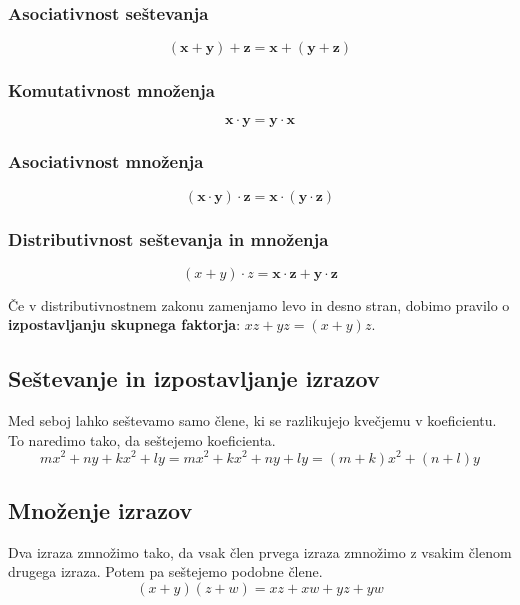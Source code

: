     
                    \subsubsection*{Asociativnost seštevanja}
                    $$ \mathbf{(x+ y)+ z=x+ (y+ z)}$$
                
    
    
                    \subsubsection*{Komutativnost množenja}
                   $$ \mathbf{x\cdot y=y\cdot x}$$
                
    
                   \subsubsection*{Asociativnost množenja}
                    $$ \mathbf{(x\cdot y)\cdot z=x\cdot (y\cdot z)}$$
                
    
    
                \subsubsection*{Distributivnost seštevanja in množenja}
                    $$ (x+y)\cdot z=\mathbf{x\cdot z+y\cdot z} $$
                
        
    
        
            
                Če v distributivnostnem zakonu zamenjamo levo in desno stran, dobimo pravilo o \textbf{izpostavljanju skupnega faktorja}: $xz+yz=(x+y)z$.
            
    
            \subsection{Seštevanje in izpostavljanje izrazov}
                Med seboj lahko seštevamo samo člene, ki se razlikujejo kvečjemu v koeficientu. To naredimo tako, da seštejemo koeficienta.
                $$mx^2+ny+kx^2+ly=mx^2+kx^2+ny+ly=(m+k)x^2+(n+l)y $$
            
    
            \subsection{Množenje izrazov}
                Dva izraza zmnožimo tako, da vsak člen prvega izraza zmnožimo z vsakim členom drugega izraza. Potem pa seštejemo podobne člene.
                $$(x+y)(z+w)=xz+xw+yz+yw $$
            
